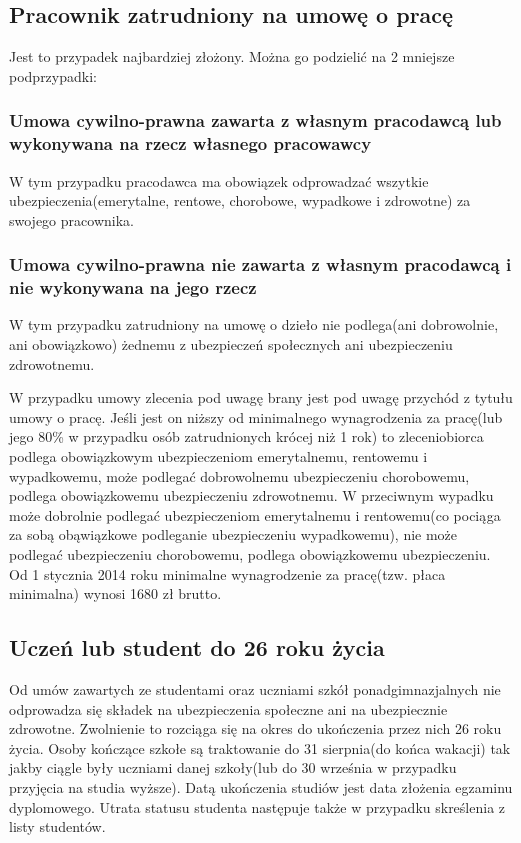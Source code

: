 \subsection[Pracownik zatrudniony na umowę o pracę][Pracownik zatrudniony na umowę o pracę]{Pracownik zatrudniony na umowę o pracę}
\label{umowaOPrace}
Jest to przypadek najbardziej złożony. Można go podzielić na 2 mniejsze podprzypadki:

\subsubsection{Umowa cywilno-prawna zawarta z własnym pracodawcą lub wykonywana na rzecz własnego pracowawcy}
W tym przypadku pracodawca ma obowiązek odprowadzać wszytkie ubezpieczenia(emerytalne, rentowe, chorobowe, wypadkowe i zdrowotne) za swojego pracownika.

\subsubsection{Umowa cywilno-prawna nie zawarta z własnym pracodawcą i nie wykonywana na jego rzecz}
W tym przypadku zatrudniony na umowę o dzieło nie podlega(ani dobrowolnie, ani obowiązkowo) żednemu z ubezpieczeń społecznych ani ubezpieczeniu zdrowotnemu. 

W przypadku umowy zlecenia pod uwagę brany jest pod uwagę przychód z tytułu umowy o pracę. Jeśli jest on niższy od minimalnego wynagrodzenia za pracę(lub jego 80\% w przypadku osób zatrudnionych krócej niż 1 rok) to zleceniobiorca podlega obowiązkowym ubezpieczeniom emerytalnemu, rentowemu i wypadkowemu, może podlegać dobrowolnemu ubezpieczeniu chorobowemu, podlega obowiązkowemu ubezpieczeniu zdrowotnemu. W przeciwnym wypadku może dobrolnie podlegać ubezpieczeniom emerytalnemu i rentowemu(co pociąga za sobą obąwiązkowe podleganie ubezpieczeniu wypadkowemu), nie może podlegać ubezpieczeniu chorobowemu, podlega obowiązkowemu ubezpieczeniu. Od 1 stycznia 2014 roku minimalne wynagrodzenie za pracę(tzw. płaca minimalna) wynosi 1680 zł brutto.

\subsection[Uczeń lub student do 26 roku życia][Uczeń lub student do 26 roku życia]{Uczeń lub student do 26 roku życia}
Od umów zawartych ze studentami oraz uczniami szkół ponadgimnazjalnych nie odprowadza się składek na ubezpieczenia społeczne ani na ubezpiecznie zdrowotne. Zwolnienie to rozciąga się na okres do ukończenia przez nich 26 roku życia. Osoby kończące szkołe są traktowanie do 31 sierpnia(do końca wakacji)  tak jakby ciągle były uczniami danej szkoły(lub do 30 września w przypadku przyjęcia na studia wyższe). Datą ukończenia studiów jest data złożenia egzaminu dyplomowego. Utrata statusu studenta następuje także w przypadku skreślenia z listy studentów.

